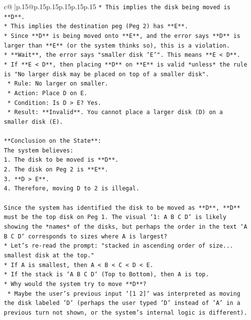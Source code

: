 \documentclass{article}
\begin{document}
{\begin{supertabular}{c@{$\;$}|p{.15\linewidth}@{}p{.15\linewidth}p{.15\linewidth}p{.15\linewidth}p{.15\linewidth}p{.15\linewidth}}
{{{\texttt{*   This implies the disk being moved is **D**.} \\
\texttt{*   This implies the destination peg (Peg 2) has **E**.} \\
\texttt{*   Since **D** is being moved onto **E**, and the error says **D** is larger than **E** (or the system thinks so), this is a violation.} \\
\texttt{*   **Wait**, the error says "smaller disk 'E'". This means **E < D**.} \\
\texttt{*   If **E < D**, then placing **D** on **E** is valid *unless* the rule is "No larger disk may be placed on top of a smaller disk".} \\
\texttt{    *   Rule: No larger on smaller.} \\
\texttt{    *   Action: Place D on E.} \\
\texttt{    *   Condition: Is D > E? Yes.} \\
\texttt{    *   Result: **Invalid**. You cannot place a larger disk (D) on a smaller disk (E).} \\
\\ 
\texttt{**Conclusion on the State**:} \\
\texttt{The system believes:} \\
\texttt{1.  The disk to be moved is **D**.} \\
\texttt{2.  The disk on Peg 2 is **E**.} \\
\texttt{3.  **D > E**.} \\
\texttt{4.  Therefore, moving D to 2 is illegal.} \\
\\ 
\texttt{Since the system has identified the disk to be moved as **D**, **D** must be the top disk on Peg 1. The visual `1: A B C D` is likely showing the *names* of the disks, but perhaps the order in the text `A B C D` corresponds to sizes where A is largest?} \\
\texttt{*   Let's re{-}read the prompt: "stacked in ascending order of size... smallest disk at the top."} \\
\texttt{*   If A is smallest, then A < B < C < D < E.} \\
\texttt{*   If the stack is `A B C D` (Top to Bottom), then A is top.} \\
\texttt{*   Why would the system try to move **D**?} \\
\texttt{    *   Maybe the user's previous input `{[}1 2{]}` was interpreted as moving the disk labeled 'D' (perhaps the user typed 'D' instead of 'A' in a previous turn not shown, or the system's internal logic is different).} \\
}}}
\end{supertabular}}
\end{document}

